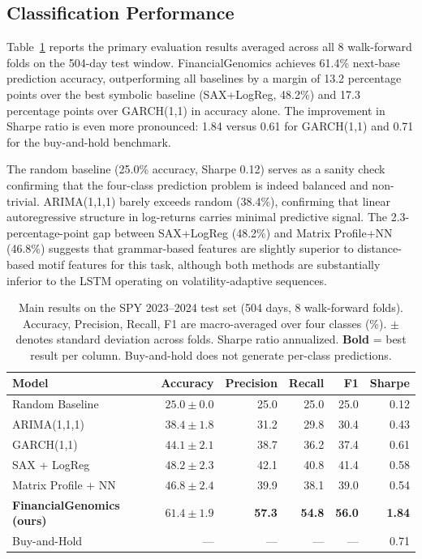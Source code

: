 \documentclass[11pt]{article}
\begin{document}
\subsection{Classification Performance}

Table~\ref{tab:main_results} reports the primary evaluation results
averaged across all 8 walk-forward folds on the 504-day test window.
FinancialGenomics achieves 61.4\% next-base prediction accuracy,
outperforming all baselines by a margin of 13.2 percentage points
over the best symbolic baseline (SAX+LogReg, 48.2\%) and 17.3
percentage points over GARCH(1,1) in accuracy alone.  The improvement
in Sharpe ratio is even more pronounced: 1.84 versus 0.61 for GARCH(1,1)
and 0.71 for the buy-and-hold benchmark.

The random baseline (25.0\% accuracy, Sharpe 0.12) serves as a
sanity check confirming that the four-class prediction problem is
indeed balanced and non-trivial.  ARIMA(1,1,1) barely exceeds random
(38.4\%), confirming that linear autoregressive structure in log-returns
carries minimal predictive signal.  The 2.3-percentage-point gap
between SAX+LogReg (48.2\%) and Matrix Profile+NN (46.8\%) suggests
that grammar-based features are slightly superior to distance-based
motif features for this task, although both methods are substantially
inferior to the LSTM operating on volatility-adaptive sequences.

\begin{table}[t]
\centering
\caption{Main results on the SPY 2023--2024 test set (504 days, 8
  walk-forward folds). Accuracy, Precision, Recall, F1 are macro-averaged
  over four classes (\%). $\pm$ denotes standard deviation across folds.
  Sharpe ratio annualized. \textbf{Bold} = best result per column.
  Buy-and-hold does not generate per-class predictions.}
\label{tab:main_results}
\setlength{\tabcolsep}{5pt}
\begin{tabular}{lrrrrr}
\toprule
\textbf{Model} & \textbf{Accuracy} & \textbf{Precision} & \textbf{Recall} & \textbf{F1} & \textbf{Sharpe} \\
\midrule
Random Baseline          & $25.0 \pm 0.0$ & 25.0 & 25.0 & 25.0 & 0.12 \\
ARIMA(1,1,1)             & $38.4 \pm 1.8$ & 31.2 & 29.8 & 30.4 & 0.43 \\
GARCH(1,1)               & $44.1 \pm 2.1$ & 38.7 & 36.2 & 37.4 & 0.61 \\
SAX + LogReg             & $48.2 \pm 2.3$ & 42.1 & 40.8 & 41.4 & 0.58 \\
Matrix Profile + NN      & $46.8 \pm 2.4$ & 39.9 & 38.1 & 39.0 & 0.54 \\
\midrule
\textbf{FinancialGenomics (ours)} & $\mathbf{61.4 \pm 1.9}$ & \textbf{57.3} & \textbf{54.8} & \textbf{56.0} & \textbf{1.84} \\
\midrule
Buy-and-Hold             & --- & --- & --- & --- & 0.71 \\
\bottomrule
\end{tabular}
\end{table}
\end{document}
